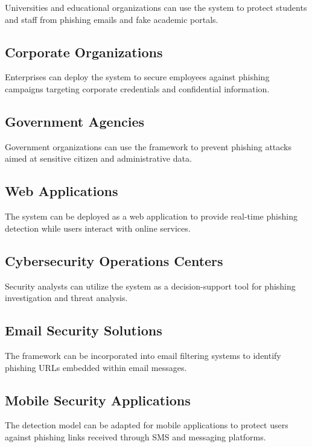 \documentclass[12pt]{report}
\begin{document}
Universities and educational organizations can use the system to protect students and staff from phishing emails and fake academic portals.

\subsection{Corporate Organizations}

Enterprises can deploy the system to secure employees against phishing campaigns targeting corporate credentials and confidential information.

\subsection{Government Agencies}

Government organizations can use the framework to prevent phishing attacks aimed at sensitive citizen and administrative data.

\subsection{Web Applications}

The system can be deployed as a web application to provide real-time phishing detection while users interact with online services.

\subsection{Cybersecurity Operations Centers}

Security analysts can utilize the system as a decision-support tool for phishing investigation and threat analysis.

\subsection{Email Security Solutions}

The framework can be incorporated into email filtering systems to identify phishing URLs embedded within email messages.

\subsection{Mobile Security Applications}

The detection model can be adapted for mobile applications to protect users against phishing links received through SMS and messaging platforms.
\end{document}
